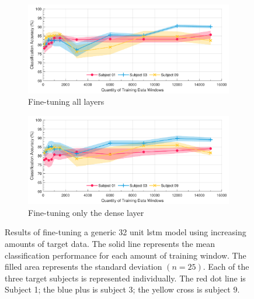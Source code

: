 \begin{figure}[p]
    \centering
    \begin{subfigure}{\textwidth}
        \centering
        \includegraphics[width=\textwidth]{content/5-Personalisation/ch5_pre_trained_model_accuracy.pdf}
        \caption{Fine-tuning all layers}
        \label{subfig:ch5_fine-tuning-all-layers}
    \end{subfigure}
    \begin{subfigure}{\textwidth}
        \centering
        \includegraphics[width=\textwidth]{content/5-Personalisation/ch5_frozen_lstm_layer_accuracy.pdf}
        \caption{Fine-tuning only the dense layer}
    \end{subfigure}
    \caption[Fine-tuning an  model using target data]{Results of fine-tuning a generic 32 unit \acrshort{lstm} model using increasing amounts of target data. The solid line represents the mean classification performance for each amount of training window. The filled area represents the standard deviation $(n=25)$. Each of the three target subjects is represented individually. The red dot line is Subject 1; the blue plus is subject 3; the yellow cross is subject 9.}
    \label{fig:ch5_pretrained_model}
\end{figure}
